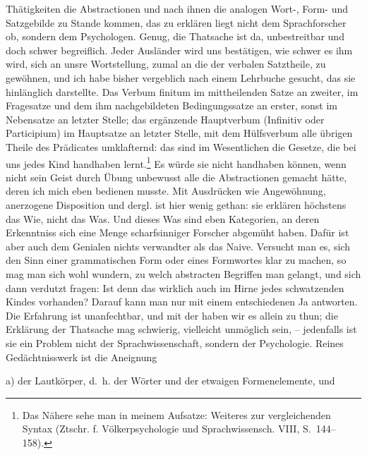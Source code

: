  Thätigkeiten die Abstractionen und nach ihnen die analogen Wort-, Form- und Satzgebilde zu Stande kommen, das zu erklären liegt nicht dem Sprachforscher ob, sondern dem Psychologen. Genug, die Thatsache ist da, unbestreitbar und doch schwer begreiflich. Jeder Ausländer wird uns bestätigen, wie schwer es ihm wird, sich an unsre Wortstellung, zumal an die der verbalen Satztheile, zu gewöhnen, und ich habe bisher vergeblich nach einem Lehrbuche gesucht, das sie hinlänglich darstellte. Das Verbum finitum im mittheilenden Satze an zweiter, im Fragesatze und dem ihm nachgebildeten Bedingungssatze an erster, sonst im Nebensatze an letzter Stelle; das ergänzende Hauptverbum (Infinitiv oder Participium) im Hauptsatze an letzter Stelle, mit dem Hülfsverbum alle übrigen Theile des Prädicates umklafternd: das sind im Wesentlichen die Gesetze, die bei uns jedes Kind handhaben lernt.\footnote{Das Nähere sehe man in meinem Aufsatze: Weiteres zur vergleichenden Syntax (Ztschr. f. Völkerpsychologie und Sprachwissensch. VIII, S.~144–158).} Es würde sie nicht handhaben können, wenn nicht sein Geist durch Übung unbewusst alle die Abstractionen gemacht hätte, deren ich mich eben bedienen musste. Mit Ausdrücken wie Angewöhnung, anerzogene Disposition und dergl. ist hier wenig gethan: sie erklären höchstens das Wie, nicht das Was. Und dieses Was sind eben Kategorien, an deren Erkenntniss sich \label{fp.64} eine Menge scharfsinniger Forscher abgemüht haben. Dafür ist aber auch dem Genialen nichts verwandter als das Naive. Versucht man es, sich den Sinn einer grammatischen Form oder eines Formwortes klar zu machen, so mag man sich wohl wundern, zu welch abstracten Begriffen man gelangt, und sich dann verdutzt fragen: Ist denn das wirklich auch im Hirne jedes schwatzenden Kindes vorhanden? Da\label{sp.64}rauf kann man nur mit einem entschiedenen Ja antworten. Die Erfahrung ist unanfechtbar, und mit der haben wir es allein zu thun; die Erklärung der Thatsache mag schwierig, vielleicht unmöglich sein, – jedenfalls ist sie ein Problem nicht der Sprachwissenschaft, sondern der Psychologie. Reines Gedächtnisswerk ist die Aneignung

a) der Lautkörper, d.~h. der Wörter und der etwaigen Formenelemente, und

